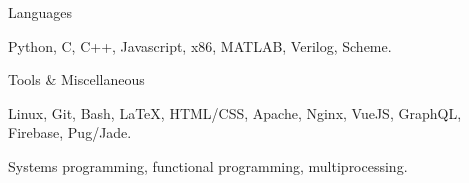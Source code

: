 \begin{cventries}
  \cventry
    {Languages}
    {}
    {}
    {}
    {
      \begin{cvitems}
        \item {Python, C, C++, Javascript, x86, MATLAB, Verilog, Scheme.}
      \end{cvitems}
    }
  \cventry
    {Tools \& Miscellaneous }
    {}
    {}
    {}
    {
      \begin{cvitems}
        \item {Linux, Git, Bash, \LaTeX, HTML/CSS, Apache, Nginx, VueJS, GraphQL, Firebase, Pug/Jade.}
        \item {Systems programming, functional programming, multiprocessing.}
      \end{cvitems}
    }
\end{cventries}
